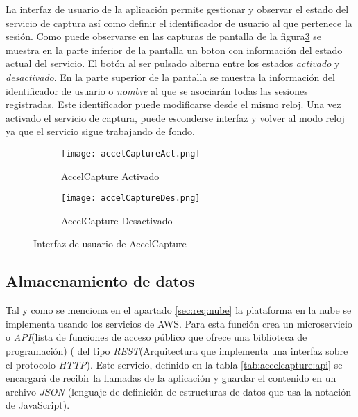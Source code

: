 La interfaz de usuario de la aplicación permite gestionar y observar el estado del servicio de captura así como definir el identificador de usuario al que pertenece la sesión. Como puede observarse en las capturas de pantalla de la figura\ref{fig:accelcapture:UI} se muestra en la parte inferior de la pantalla un boton con información del estado actual del servicio. El botón al ser pulsado alterna entre los estados \textit{activado} y \textit{desactivado}. En la parte superior de la pantalla se muestra la información del identificador de usuario o \textit{nombre} al que se asociarán todas las sesiones registradas. Este identificador puede modificarse desde el mismo reloj. Una vez activado el servicio de captura, puede esconderse interfaz y volver al modo reloj ya que el servicio sigue trabajando de fondo. 
\begin{figure}[htb!]
  \centering
  \begin{subfigure}[b]{0.4\textwidth}
      \centering
      \texttt{[image: accelCaptureAct.png]}
      \caption{AccelCapture Activado}
      \label{fig:accelCapture:UI1}
  \end{subfigure}
  \hfill
  \begin{subfigure}[b]{0.4\textwidth}
      \centering
      \texttt{[image: accelCaptureDes.png]}
      \caption{AccelCapture Desactivado}
      \label{fig:accelCapture:UI2}
  \end{subfigure}
  \caption{\label{fig:accelcapture:UI} Interfaz de usuario de AccelCapture}
\end{figure}

\subsection{Almacenamiento de datos}


Tal y como se menciona en el apartado \ref{sec:req:nube} la plataforma en la nube se implementa usando los servicios de AWS. Para esta función crea un microservicio o \textit{API}(lista de funciones de acceso público que ofrece una biblioteca de programación) ( del tipo \textit{REST}(Arquitectura que implementa una interfaz sobre el protocolo \textit{HTTP}). Este servicio, definido en la tabla \ref{tab:accelcapture:api} se encargará de recibir la llamadas de la aplicación y guardar el contenido en un archivo \textit{JSON} (lenguaje de definición de estructuras de datos que usa la notación de JavaScript).

